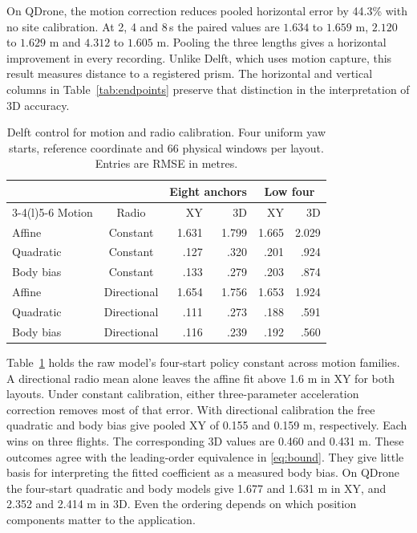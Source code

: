 \documentclass{IEEEtaes}
\begin{document}
On QDrone, the motion correction reduces pooled horizontal error by 44.3\% with no site calibration. At 2, 4 and 8\,s the paired values are \(1.634\) to \(1.659\) m, \(2.120\) to \(1.629\) m and \(4.312\) to \(1.605\) m. Pooling the three lengths gives a horizontal improvement in every recording. Unlike Delft, which uses motion capture, this result measures distance to a registered prism. The horizontal and vertical columns in Table~\ref{tab:endpoints} preserve that distinction in the interpretation of 3D accuracy.

\begin{table}[t]
\caption{Delft control for motion and radio calibration. Four uniform yaw starts, reference coordinate and 66 physical windows per layout. Entries are RMSE in metres.}
\label{tab:motion}\centering\tablefont
\begin{tabular}{@{}lcrrrr@{}}
\toprule
& &\multicolumn{2}{c}{Eight anchors}&\multicolumn{2}{c}{Low four}\\
\cmidrule(lr){3-4}\cmidrule(l){5-6}
Motion&Radio&XY&3D&XY&3D\\\midrule
Affine&Constant&1.631&1.799&1.665&2.029\\
Quadratic&Constant&.127&.320&.201&.924\\
Body bias&Constant&.133&.279&.203&.874\\
Affine&Directional&1.654&1.756&1.653&1.924\\
Quadratic&Directional&.111&.273&.188&.591\\
Body bias&Directional&.116&.239&.192&.560\\
\bottomrule
\end{tabular}
\end{table}

Table~\ref{tab:motion} holds the raw model's four-start policy constant across motion families. A directional radio mean alone leaves the affine fit above 1.6 m in XY for both layouts. Under constant calibration, either three-parameter acceleration correction removes most of that error. With directional calibration the free quadratic and body bias give pooled XY of 0.155 and 0.159 m, respectively. Each wins on three flights. The corresponding 3D values are 0.460 and 0.431 m. These outcomes agree with the leading-order equivalence in \eqref{eq:bound}. They give little basis for interpreting the fitted coefficient as a measured body bias. On QDrone the four-start quadratic and body models give 1.677 and 1.631 m in XY, and 2.352 and 2.414 m in 3D. Even the ordering depends on which position components matter to the application.
\end{document}
